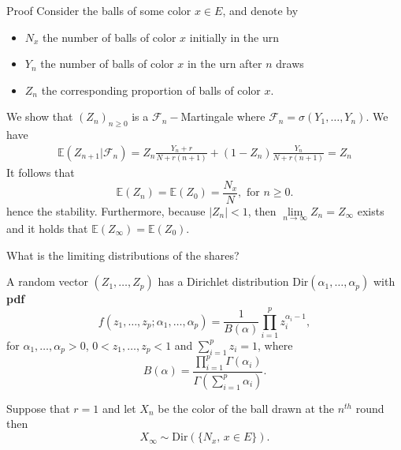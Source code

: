 \documentclass{beamer}
\makeatletter
\newcommand*{\pdf}{\textbf{pdf}\@\xspace}
\makeatother
\begin{document}
\begin{frame}{Proof}
\scriptsize
Consider the balls of some color $x\in E$, and denote by 
\begin{itemize}
\item $N_x$ the number of balls of color $x$ initially in the urn
\item $Y_n$ the number of balls of color $x$ in the urn after $n$ draws
\item $Z_n$ the corresponding proportion of balls of color $x$.
\end{itemize}   
We show that $(Z_n)_{n\geq0}$ is a $\mathcal{F}_n-$Martingale where $\mathcal{F}_n=\sigma(Y_1,\ldots, Y_n)$. We have 
\begin{eqnarray*}
\mathbb{E}(Z_{n+1}|\mathcal{F}_n) = Z_n\frac{Y_n+r}{N+r(n+1)} +(1-Z_n)\frac{Y_n}{N+r(n+1)} = Z_n
\end{eqnarray*}
It follows that 
$$
\mathbb{E}(Z_n) = \mathbb{E}(Z_0) = \frac{N_x}{N}, \text{ for }n\geq0.
$$
hence the stability. Furthermore, because $|Z_n|<1$, then $\underset{n\rightarrow\infty}{\lim} Z_n = Z_\infty$ exists and it holds that $\mathbb{E}(Z_\infty) = \mathbb{E}(Z_0)$.\\
\end{frame}
\begin{frame}{What is the limiting distributions of the shares?}
\scriptsize
\begin{tcolorbox}[enhanced,drop shadow, title=Dirichlet distribution]
A random vector $(Z_1,\ldots, Z_p)$ has a Dirichlet distribution $\text{Dir}(\alpha_1,\ldots, \alpha_p)$ with \pdf
$$
f(z_1,\ldots, z_p;\alpha_1,\ldots, \alpha_p) = \frac{1}{B(\alpha)}\prod_{i=1}^p z_i^{\alpha_i-1}, 
$$
for $\alpha_1,\ldots, \alpha_p>0$, $0< z_1,\ldots, z_p <1$ and $\sum_{i=1}^pz_i=1$, where 
$$
B(\alpha) = \frac{\prod_{i = 1}^p \Gamma(\alpha_i)}{\Gamma(\sum_{i=1}^p \alpha_i)}.
$$
\end{tcolorbox}
\begin{tcolorbox}[enhanced,drop shadow, title=Theorem (Convergence toward a Dirichlet distribution)]
Suppose that $r=1$ and let $X_n$ be the color of the ball drawn at the $n^{th}$ round then 
$$
X_\infty\sim \text{Dir}(\{N_x\text{, }x\in E\}).
$$
\end{tcolorbox}
\end{frame}
\end{document}
